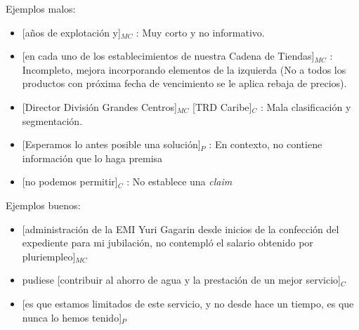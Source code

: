 \documentclass[a4paper,11pt,twocolumn,twoside]{article}
\begin{document}
Ejemplos malos:
\begin{itemize}
	\item \text{} [años de explotación y]$_{MC}$
	      : Muy corto y no informativo. %
	\item \text{} [en cada uno de los establecimientos de nuestra Cadena de Tiendas]$_{MC}$
	      : Incompleto, mejora incorporando elementos de la izquierda (No a todos los productos con próxima fecha de vencimiento se le aplica rebaja de precios). %
	\item \text{} [Director División Grandes Centros]$_{MC}$ [TRD Caribe]$_{C}$
	      : Mala clasificación y segmentación. %
	\item \text{} [Esperamos lo antes posible una solución]$_{P}$
	      : En contexto, no contiene información que lo haga premisa %
	\item \text{} [no podemos permitir]$_{C}$
	      : No establece una \textit{claim} %
\end{itemize}

Ejemplos buenos:
\begin{itemize}
	\item \text{} [administración de la EMI Yuri Gagarin desde inicios de la confección del expediente para
		      mi jubilación, no contempló el salario obtenido por pluriempleo]$_{MC}$ %
	\item pudiese [contribuir al ahorro de agua y la prestación de un mejor servicio]$_C$ %
	\item \text{} [es que estamos limitados de este servicio, y no desde hace un tiempo, es que nunca lo hemos tenido]$_P$ %
\end{itemize}
\end{document}
